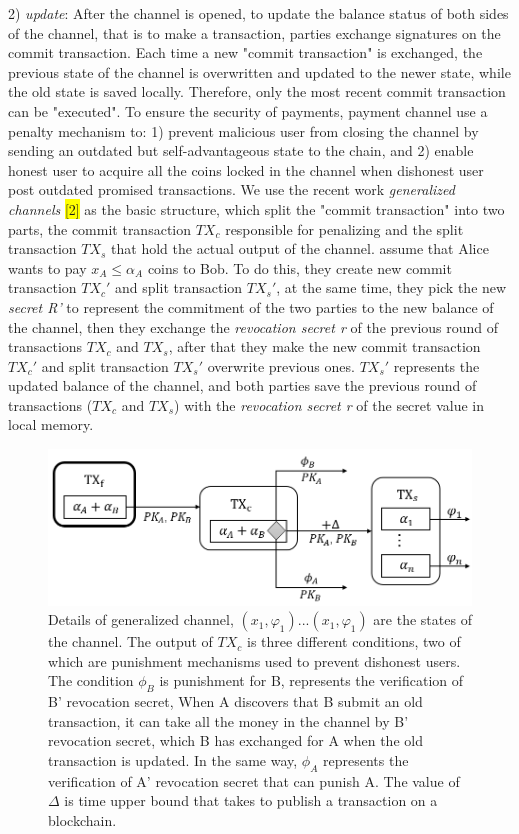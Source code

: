 \documentclass[conference]{IEEEtran}
\begin{document}
2) \emph{update}: After the channel is opened, to update the balance status of both sides of the channel, that is to make a 
transaction, parties exchange signatures on the commit transaction. Each time a new "commit transaction" is exchanged, the 
previous state of the channel is overwritten and updated to the newer state, while the old state is saved locally. Therefore, 
only the most recent commit transaction can be "executed". To ensure the security of payments, payment channel use a penalty 
mechanism to: 1) prevent malicious user from closing the channel by sending an outdated but self-advantageous state to the chain, 
and 2) enable honest user to acquire all the coins locked in the channel when dishonest user post outdated promised transactions. 
We use the recent work \emph{generalized channels} \colorbox{yellow}{[2]} as the basic structure, which split the "commit transaction" 
into two parts, the commit transaction $TX_c$ responsible for penalizing and the split transaction $TX_s$ that hold the actual output 
of the channel. assume that Alice wants to pay $x_A \leq \alpha_A$ coins to Bob. To do this, they create new commit transaction $TX_c'$ 
and split transaction $TX_s'$, at the same time, they pick the new \emph{secret R'} to represent the commitment of the two parties 
to the new balance of the channel, then they exchange the \emph{revocation secret r} of the previous round of transactions $TX_c$ 
and $TX_s$, after that they make the new commit transaction $TX_c'$ and split transaction $TX_s'$ overwrite previous ones. $TX_s'$ 
represents the updated balance of the channel, and both parties save the previous round of transactions ($TX_c$ and $TX_s$) with the 
\emph{revocation secret r} of the secret value in local memory.

\begin{figure}[t]
	\centering
	\includegraphics[scale=0.45]{fig3.png}
	\caption{Details of generalized channel, $(x_1,\varphi_1)...(x_1,\varphi_1)$ are the states of the channel. 
	The output of $TX_c$ is three different conditions, two of which are punishment mechanisms used to prevent 
	dishonest users. The condition $\phi_B$ is punishment for B, represents the verification of B’ revocation 
	secret, When A discovers that B submit an old transaction, it can take all the money in the channel by B' 
	revocation secret, which B has exchanged for A when the old transaction is updated. In the same way, $\phi_A$ 
	represents the verification of A’ revocation secret that can punish A. The value of $\Delta$ is time upper 
	bound that takes to publish a transaction on a blockchain.
	}
\end{figure}
\end{document}
